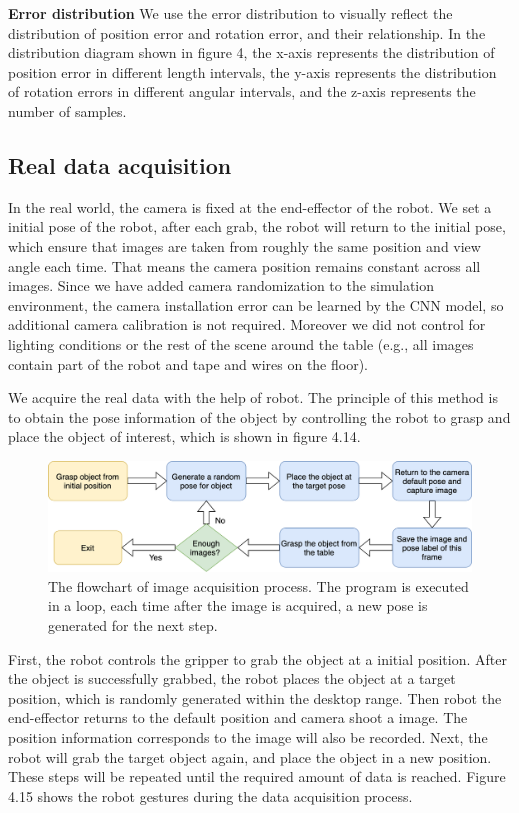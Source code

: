 \textbf{Error distribution}
We use the error distribution to visually reflect the distribution of position error and rotation error, and their relationship. In the distribution diagram shown in figure 4, the x-axis represents the distribution of position error in different length intervals, the y-axis represents the distribution of rotation errors in different angular intervals, and the z-axis represents the number of samples.

\subsection{Real data acquisition}
In the real world, the camera is fixed at the end-effector of the robot. We set a initial pose of the robot, after each grab, the robot will return to the initial pose, which ensure that images are taken from roughly the same position and view angle each time. That means the camera position remains constant across all images. Since we have added camera randomization to the simulation environment, the camera installation error can be learned by the CNN model, so additional camera calibration is not required. Moreover we did not control for lighting conditions or the rest of the scene around the table (e.g., all images contain part of the robot and tape and wires on the floor).

We acquire the real data with the help of robot. The principle of this method is to obtain the pose information of the object by controlling the robot to grasp and place the object of interest, which is shown in figure 4.14. 

\begin{figure}[h]
	\includegraphics[width=\textwidth]{Figures/Section4_image_acquisition.png} 
	\centering
	\caption{The flowchart of image acquisition process. The program is executed in a loop, each time after the image is acquired, a new pose is generated for the next step.}
	\label{fig:vgg16/}
\end{figure}

First, the robot controls the gripper to grab the object at a initial position. After the object is successfully grabbed, the robot places the object at a target position, which is randomly generated within the desktop range. Then robot the end-effector returns to the default position and camera shoot a image. The position information corresponds to the image will also be recorded. Next, the robot will grab the target object again, and place the object in a new position. These steps will be repeated until the required amount of data is reached. Figure 4.15 shows the robot gestures during the data acquisition process.

